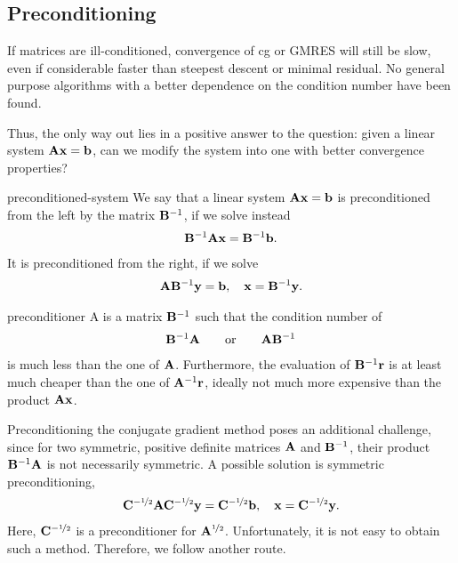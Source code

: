 \subsection{Preconditioning}

\begin{intro}
  If matrices are ill-conditioned, convergence of cg or
  GMRES will still be slow, even if considerable faster than steepest
  descent or minimal residual. No general purpose algorithms with a
  better dependence on the condition number have been found.

  Thus, the only way out lies in a positive answer to the question:
  given a linear system $\mathbf A\mathbf x = \mathbf b$, can we modify the system
  into one with better convergence properties?
\end{intro}

\begin{Definition}{preconditioned-system}
  We say that a linear system $\mathbf A\mathbf x=\mathbf b$ is preconditioned from
  the left by the matrix $\mathbf B^{-1}$, if we solve instead
  \begin{gather}
    \mathbf B^{-1}\mathbf A\mathbf x = \mathbf B^{-1}\mathbf b.
  \end{gather}
  It is preconditioned from the right, if we solve
  \begin{gather}
    \mathbf A\mathbf B^{-1}\mathbf y = \mathbf b,\quad \mathbf x = \mathbf B^{-1}\mathbf y.
  \end{gather}
\end{Definition}

\begin{Definition}{preconditioner}
  A  is a matrix $\mathbf B^{-1}$ such that the
  condition number of
  \begin{gather}
    \mathbf B^{-1}\mathbf A\qquad\text{or}\qquad \mathbf A\mathbf B^{-1}
  \end{gather}
  is much less than the one of $\mathbf A$. Furthermore, the evaluation
  of $\mathbf B^{-1}\mathbf r$ is at least much cheaper than the one of
  $\mathbf A^{-1}\mathbf r$, ideally not much more expensive than the product
  $\mathbf A\mathbf x$.
\end{Definition}

\begin{intro}
  Preconditioning the conjugate gradient method poses an additional
  challenge, since for two symmetric, positive definite matrices
  $\mathbf A$ and $\mathbf B^{-1}$, their product $\mathbf B^{-1}\mathbf A$ is not
  necessarily symmetric. A possible solution is symmetric
  preconditioning,
  \begin{gather}
    \mathbf C^{-\nicefrac12} \mathbf A \mathbf C^{-\nicefrac12} \mathbf y
    = \mathbf C^{-\nicefrac12}\mathbf b,
    \quad \mathbf x = \mathbf C^{-\nicefrac12} \mathbf y.
  \end{gather}
  Here, $\mathbf C^{-\nicefrac12}$ is a preconditioner for
  $\mathbf A^{\nicefrac12}$. Unfortunately, it is not easy to obtain such
  a method. Therefore, we follow another route.
\end{intro}

